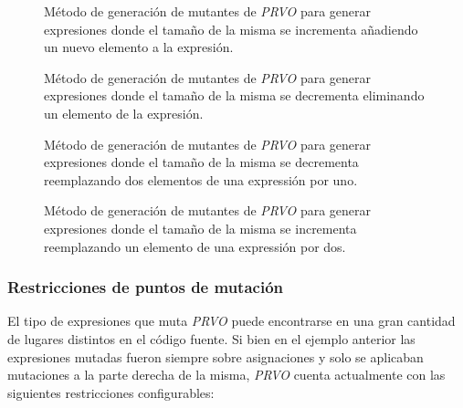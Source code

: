 \begin{figure}
	
	\caption[Funciones \emph{PRVO}, \emph{\#increaseLength}]{M\'etodo de generaci\'on de mutantes de \emph{PRVO} para generar expresiones donde el tama\~no de la misma se incrementa a\~nadiendo un nuevo elemento a la expresi\'on.}
	\label{figures.code.prvoMethods.increaseLength}
\end{figure}

\begin{figure}
	
	\caption[Funciones \emph{PRVO}, \emph{\#decreaseLength}]{M\'etodo de generaci\'on de mutantes de \emph{PRVO} para generar expresiones donde el tama\~no de la misma se decrementa eliminando un elemento de la expresi\'on.}
	\label{figures.code.prvoMethods.decreaseLength}
\end{figure}

\begin{figure}
	
	\caption[Funciones \emph{PRVO}, \emph{\#twoByOne}]{M\'etodo de generaci\'on de mutantes de \emph{PRVO} para generar expresiones donde el tama\~no de la misma se decrementa reemplazando dos elementos de una expressi\'on por uno.}
	\label{figures.code.prvoMethods.twoByOne}
\end{figure}

\begin{figure}
	
	\caption[Funciones \emph{PRVO}, \emph{\#oneByTwo}]{M\'etodo de generaci\'on de mutantes de \emph{PRVO} para generar expresiones donde el tama\~no de la misma se incrementa reemplazando un elemento de una expressi\'on por dos.}
	\label{figures.code.prvoMethods.oneByTwo}
\end{figure}

\subsubsection{Restricciones de puntos de mutaci\'on}

El tipo de expresiones que muta \emph{PRVO} puede encontrarse en una gran cantidad de lugares distintos en el c\'odigo fuente. Si bien en el ejemplo anterior las expresiones mutadas fueron siempre sobre asignaciones y solo se aplicaban mutaciones a la parte derecha de la misma, \emph{PRVO} cuenta actualmente con las siguientes restricciones configurables:

